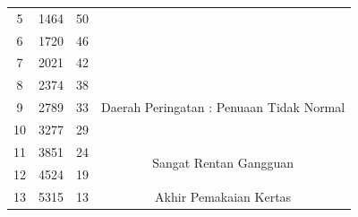 \begin{table}[h]
\begin{tabular}{|c|c|c|c|}
		\cline{1-3}
		5           & 1464                                                                             & 50                                                                                     &                                                              \\ 
		\cline{1-3}
		6           & 1720                                                                             & 46                                                                                     &                                                              \\ 
		\cline{1-3}
		7           & 2021                                                                             & 42                                                                                     &                                                              \\ 
		\hline
		8           & 2374                                                                             & 38                                                                                     & \multirow{3}{*}{Daerah Peringatan : Penuaan Tidak Normal}  \\ 
		\cline{1-3}
		9           & 2789                                                                             & 33                                                                                     &                                                              \\ 
		\cline{1-3}
		10          & 3277                                                                             & 29                                                                                     &                                                              \\ 
		\hline
		11          & 3851                                                                             & 24                                                                                     & \multirow{2}{*}{Sangat Rentan Gangguan}             \\ 
		\cline{1-3}
		12          & 4524                                                                             & 19                                                                                     &                                                              \\ 
		\hline
		13          & 5315                                                                             & 13                                                                                     & \multirow{3}{*}{Akhir Pemakaian Kertas}                   \\ 

\end{tabular}
\end{table}
